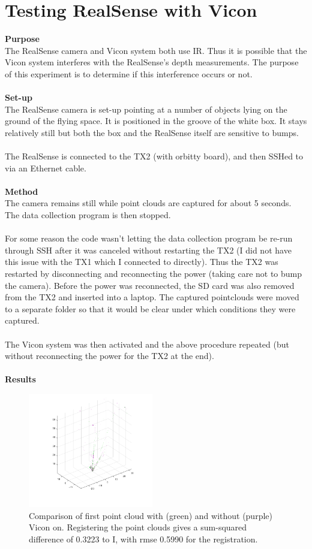 \documentclass[12pt,a4paper]{article}
\begin{document}
\section{Testing RealSense with Vicon}
\textbf{Purpose} \\
The RealSense camera and Vicon system both use IR. Thus it is possible that the Vicon system interferes with the RealSense's depth measurements. The purpose of this experiment is to determine if this interference occurs or not.
\\\\
\textbf{Set-up} \\
The RealSense camera is set-up pointing at a number of objects lying on the ground of the flying space. It is positioned in the groove of the white box. It stays relatively still but both the box and the RealSense itself are sensitive to bumps.
\\\\
The RealSense is connected to the TX2 (with orbitty board), and then SSHed to via an Ethernet cable. 
\\\\
\textbf{Method} \\
The camera remains still while point clouds are captured for about 5 seconds. The data collection program is then stopped. 
\\\\
For some reason the code wasn't letting the data collection program be re-run through SSH after it was canceled without restarting the TX2 (I did not have this issue with the TX1 which I connected to directly). Thus the TX2 was restarted by disconnecting and reconnecting the power (taking care not to bump the camera). Before the power was reconnected, the SD card was also removed from the TX2 and inserted into a laptop. The captured pointclouds were moved to a separate folder so that it would be clear under which conditions they were captured.
\\\\
The Vicon system was then activated and the above procedure repeated (but without reconnecting the power for the TX2 at the end).
\\\\
\textbf{Results} \\
	\begin{figure}[h]
		\centering
		\includegraphics[height=50mm, trim = 20mm 20mm 20mm 20mm, clip]{first_frame_compare.png}
		\caption{Comparison of first point cloud with (green) and without (purple) Vicon on. Registering the point clouds gives a sum-squared difference of 0.3223 to I, with rmse 0.5990 for the registration.}
		\label{f: vicon first frame}
	\end{figure}
\end{document}
